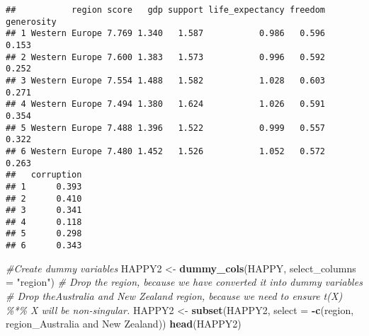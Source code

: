 \documentclass[
]{article}
\newenvironment{Shaded}{\begin{snugshade}}{\end{snugshade}}
\newcommand{\AttributeTok}[1]{\textcolor[rgb]{0.13,0.29,0.53}{#1}}
\newcommand{\CommentTok}[1]{\textcolor[rgb]{0.56,0.35,0.01}{\textit{#1}}}
\newcommand{\FunctionTok}[1]{\textcolor[rgb]{0.13,0.29,0.53}{\textbf{#1}}}
\newcommand{\NormalTok}[1]{#1}
\newcommand{\OtherTok}[1]{\textcolor[rgb]{0.56,0.35,0.01}{#1}}
\newcommand{\SpecialCharTok}[1]{\textcolor[rgb]{0.81,0.36,0.00}{\textbf{#1}}}
\newcommand{\StringTok}[1]{\textcolor[rgb]{0.31,0.60,0.02}{#1}}
\begin{document}
\begin{verbatim}
##           region score   gdp support life_expectancy freedom generosity
## 1 Western Europe 7.769 1.340   1.587           0.986   0.596      0.153
## 2 Western Europe 7.600 1.383   1.573           0.996   0.592      0.252
## 3 Western Europe 7.554 1.488   1.582           1.028   0.603      0.271
## 4 Western Europe 7.494 1.380   1.624           1.026   0.591      0.354
## 5 Western Europe 7.488 1.396   1.522           0.999   0.557      0.322
## 6 Western Europe 7.480 1.452   1.526           1.052   0.572      0.263
##   corruption
## 1      0.393
## 2      0.410
## 3      0.341
## 4      0.118
## 5      0.298
## 6      0.343
\end{verbatim}

\begin{Shaded}
\begin{Highlighting}[]
\CommentTok{\#Create dummy variables}
\NormalTok{HAPPY2 }\OtherTok{\textless{}{-}} \FunctionTok{dummy\_cols}\NormalTok{(HAPPY, }\AttributeTok{select\_columns =} \StringTok{"region"}\NormalTok{)}
\CommentTok{\# Drop the \textasciigrave{}region\textasciigrave{}, because we have converted it into dummy variables}
\CommentTok{\# Drop the\textasciigrave{}Australia and New Zealand\textasciigrave{} region, because we need to ensure t(X) \%*\% X will be non{-}singular.}
\NormalTok{HAPPY2 }\OtherTok{\textless{}{-}} \FunctionTok{subset}\NormalTok{(HAPPY2, }\AttributeTok{select =} \SpecialCharTok{{-}}\FunctionTok{c}\NormalTok{(region, }\StringTok{\textasciigrave{}}\AttributeTok{region\_Australia and New Zealand}\StringTok{\textasciigrave{}}\NormalTok{))}
\FunctionTok{head}\NormalTok{(HAPPY2)}
\end{Highlighting}
\end{Shaded}
\end{document}
